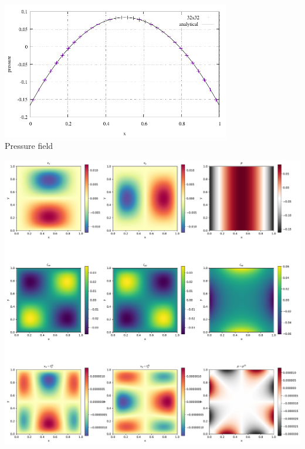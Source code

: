\begin{center}
\includegraphics[width=10cm]{python_codes/fieldstone_01/results/pressure.pdf}\\
{\captionfont Pressure field}
\end{center}

\begin{center}
\includegraphics[width=15cm]{python_codes/fieldstone_01/results/solution.pdf}
\end{center}

